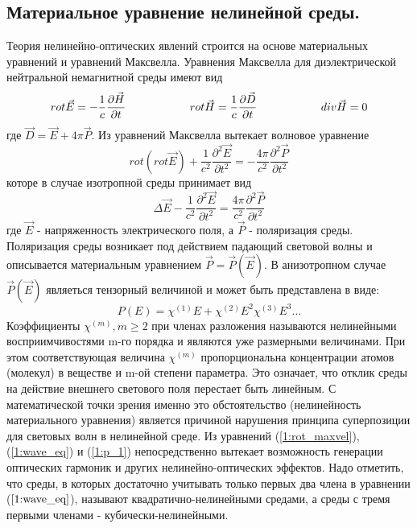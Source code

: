 \subsection{Материальное уравнение нелинейной среды.} 
\hspace*{2mm}
Теория нелинейно-оптических явлений строится на основе материальных уравнений и уравнений Максвелла. Уравнения Максвелла для диэлектрической нейтральной немагнитной среды имеют вид
\begin{equation}\label{1:maxvel}
rot\vec{E} = - \frac{ 1 }{ c}\frac{\partial \vec{H} }{\partial t}
\hspace{20mm}
rot\vec{H} =  \frac{ 1 }{ c}\frac{\partial \vec{D} }{\partial t}
\hspace{20mm}
div\vec{H} = 0
\end{equation}
где $ \vec{D} = \vec{E} + 4\pi \vec{P}$. Из уравнений Максвелла вытекает волновое уравнение
\begin{equation}\label{1:rot_maxvel}
rot(rot\vec{E}) + \frac{ 1 }{ c^2 }\frac{\partial^2 \vec{E} }{\partial t^2} = - \frac{ 4\pi }{ c^2 }\frac{\partial^2 \vec{P} }{\partial t^2}
\end{equation}
которе в случае изотропной среды принимает вид
\begin{equation}\label{1:wave_eq}
\Delta\vec{E} - \frac{ 1 }{ c^2 }\frac{\partial^2 \vec{E} }{\partial t^2} =  \frac{ 4\pi }{ c^2 }\frac{\partial^2 \vec{P} }{\partial t^2}
\end{equation}
где $\vec{E}$ - напряженность электрического поля, а $\vec{P}$ - поляризация среды. Поляризация среды возникает под действием падающий световой волны и описывается материальным уравнением $\vec{P} = \vec{P}(\vec{E})$.
В анизотропном случае $\vec{P}(\vec{E})$ являеться тензорный величиной и может быть представлена в виде:
\begin{equation}\label{1:p_1}
P(E) = \chi^{(1)}E + \chi^{(2)}E^2 \chi^{(3)}E^3\dots
\end{equation}
Коэффициенты $\chi^{(m)}, m \ge 2$ при членах разложения называются нелинейными восприимчивостями m-го порядка и являются уже размерными величинами. При этом соответствующая величина $\chi^{(m)}$ пропорциональна концентрации атомов (молекул) в веществе и m-ой степени параметра. Это означает, что отклик среды на действие внешнего светового поля перестает быть линейным.  С математической точки зрения именно это обстоятельство (нелинейность материального уравнения) является причиной нарушения принципа суперпозиции для световых волн в нелинейной среде. Из уравнений (\ref{1:rot_maxvel}), (\ref{1:wave_eq}) и (\ref{1:p_1}) непосредственно вытекает возможность генерации оптических гармоник и других нелинейно-оптических эффектов.  Надо отметить, что среды, в которых достаточно учитывать только первых два члена в уравнении ($\ref{1:wave_eq}$), называют квадратично-нелинейными средами, а среды с тремя первыми членами - кубически-нелинейными. 

